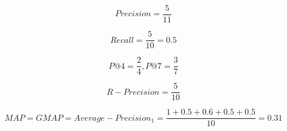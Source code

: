 \begin{boxC}
    \begin{equation*}
        Precision = \frac{5}{11} 
    \end{equation*}

    \begin{equation*}
        Recall = \frac{5}{10} = 0.5
    \end{equation*}

    \begin{equation*}
        P@4 = \frac{2}{4} , P@7 = \frac{3}{7} %
    \end{equation*}

    \begin{equation*}
        R-Precision = \frac{5}{10}
    \end{equation*}

    \begin{equation*}
        MAP = GMAP = Average-Precision_1 = \frac{1 + 0.5 + 0.6 + 0.5 + 0.5}{10} = 0.31
    \end{equation*}

\end{boxC}